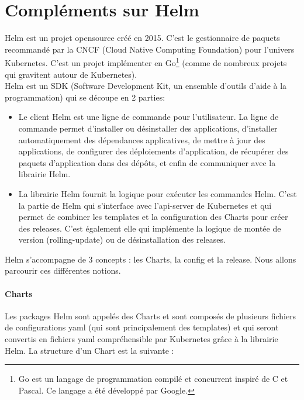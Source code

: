 \documentclass[11pt,fleqn]{book} %
\begin{document}
\chapter{Compléments sur Helm}
\label{Helm}
\vspace{-2cm}
Helm est un projet opensource créé en 2015. C'est le gestionnaire de paquets recommandé par la CNCF (Cloud Native Computing Foundation) pour l'univers Kubernetes. C'est un projet implémenter en Go\footnote{Go est un langage de programmation compilé et concurrent inspiré de C et Pascal. Ce langage a été développé par Google.} (comme de nombreux projets qui gravitent autour de Kubernetes).\\

Helm est un SDK (Software Development Kit, un ensemble d’outils d’aide à la programmation) qui se découpe en 2 parties: 
\begin{itemize}
    \item Le client Helm est une ligne de commande pour l'utilisateur. La ligne de commande permet d'installer ou désinstaller des applications, d'installer automatiquement des dépendances applicatives, de mettre à jour des applications, de configurer des déploiements d'application, de récupérer des paquets d'application dans des dépôts, et enfin de communiquer avec la librairie Helm.
    \item La librairie Helm fournit la logique pour exécuter les commandes Helm. C'est la partie de Helm qui s'interface avec l'api-server de Kubernetes et qui permet de combiner les templates et la configuration des Charts pour créer des releases. C'est également elle qui implémente la logique de montée de version (rolling-update) ou de désinstallation des releases.
\end{itemize}

Helm s'accompagne de 3 concepts : les Charts, la config et la release. Nous allons parcourir ces différentes notions.

\subsubsection{Charts}
Les packages Helm sont appelés des Charts et sont composés de plusieurs fichiers de configurations yaml (qui sont principalement des templates) et qui seront convertis en fichiers yaml compréhensible par Kubernetes grâce à la librairie Helm. La structure d'un Chart est la suivante :
\end{document}

